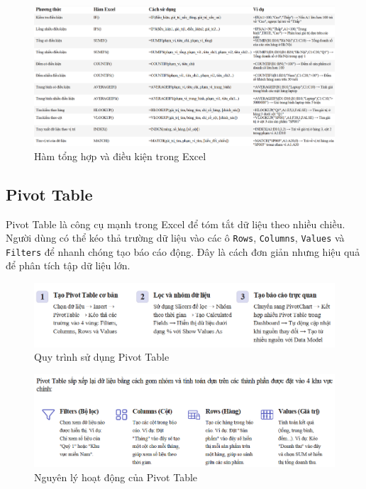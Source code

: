 \documentclass[11pt]{article}
\begin{document}
\begin{figure}[H]
    \centering
    \includegraphics[width=1.2\linewidth]{images/excel_aggregation_function.png}
    \caption{Hàm tổng hợp và điều kiện trong Excel}
    \label{fig:Excel Aggregation func}
\end{figure}


\subsection{Pivot Table}
Pivot Table là công cụ mạnh trong Excel để tóm tắt dữ liệu theo nhiều chiều. Người dùng có thể kéo thả trường dữ liệu vào các ô \texttt{Rows}, \texttt{Columns}, \texttt{Values} và \texttt{Filters} để nhanh chóng tạo báo cáo động. Đây là cách đơn giản nhưng hiệu quả để phân tích tập dữ liệu lớn.

\begin{figure}[H]
    \centering
    \includegraphics[width=1\linewidth]{images/pivotTable_flow.png}
    \caption{Quy trình sử dụng Pivot Table}
    \label{fig:how 2 use pivot table}
\end{figure}

\begin{figure}[H]
    \centering
    \includegraphics[width=1\linewidth]{images/pivotTable_Explain.png}
    \caption{Nguyên lý hoạt động của Pivot Table}
    \label{fig:pivot table mechanism}
\end{figure}
\end{document}
